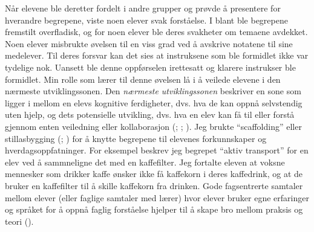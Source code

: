 \documentclass[main.tex]{subfiles}
\begin{document}
\newline
\newline
Når elevene ble deretter fordelt i andre grupper og prøvde å presentere for hverandre begrepene, 
viste noen elever svak forståelse. I blant ble begrepene fremstilt overfladisk, og for noen elever 
ble deres svakheter om temaene avdekket. Noen elever misbrukte øvelsen til en viss grad ved å 
avskrive notatene til sine medelever. Til deres forsvar kan det sies at instruksene som ble formidlet 
ikke var tydelige nok. Uansett ble denne oppførselen irettesatt og klarere instrukser ble formidlet.
\newline
\newline
Min rolle som lærer til denne øvelsen lå i å veilede elevene i den nærmeste utviklingssonen.
Den \emph{nærmeste utviklingssonen} beskriver en sone som ligger i mellom en elevs kognitive 
ferdigheter, dvs. hva de kan oppnå selvstendig uten hjelp, og dets potensielle utvikling, dvs. 
hva en elev kan få til eller forstå gjennom enten veiledning eller kollaborasjon 
(; ; ). Jeg brukte ``scaffolding'' 
eller stillasbygging (; ) for å knytte begrepene til elevenes 
forkunnskaper og hverdagsoppfatninger. For eksempel beskrev jeg begrepet ``aktiv transport'' for
en elev ved å sammneligne det med en kaffefilter. Jeg fortalte eleven at voksne mennesker som 
drikker kaffe ønsker ikke få kaffekorn i deres kaffedrink, og at de bruker en kaffefilter til å
skille kaffekorn fra drinken. Gode fagsentrerte samtaler mellom elever (eller faglige samtaler 
med lærer) hvor elever bruker egne erfaringer og språket for å oppnå faglig forståelse hjelper 
til å skape bro mellom praksis og teori ().
\end{document}
